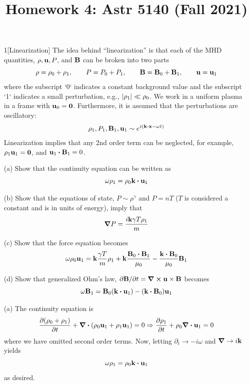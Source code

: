 \documentclass[12pt]{article}
\title{Homework 4: Astr 5140 (Fall 2021)}
\begin{document}
\maketitle
\begin{problem}{1}[Linearization]
The idea behind ``linearization'' is that each of the MHD quantities,
$\rho,\vb{u},P$, and $\vb{B}$ can be broken into two parts
\begin{equation}
    \rho=\rho_0+\rho_1,\qquad
    P=P_0+P_1,\qquad
    \vb{B}=\vb{B}_0+\vb{B}_1,\qquad
    \vb{u}=\vb{u}_1
\end{equation}
where the subscript `0` indicates a constant background value and the subscript
`1` indicates a small perturbation, e.g., $\abs{\rho_1}\ll\rho_0$. We work in a
uniform plasma in a frame with $\vb{u}_0=\vb{0}$. Furthermore, it is assumed
that the perturbations are oscillatory:
\begin{equation}
    \rho_1,P_1,\vb{B}_1,\vb{u}_1\sim e^{i(\vb{k}\vdot\vb{x}-\omega t)} 
\end{equation}
Linearization implies that any 2nd order term can be neglected, for example,
$\rho_1\vb{u}_1=\vb{0}$, and $\vb{u}_1\vdot\vb{B}_1=0$.

(a) Show that the continuity equation can be written as
\begin{equation}
    \omega\rho_1=\rho_0\vb{k}\vdot\vb{u}_1 
\end{equation}

(b) Show that the equations of state, $P\sim\rho^\gamma$ and $P=nT$ ($T$ is
considered a constant and is in units of energy), imply that
\begin{equation}
    \grad P=\frac{i\vb{k}\gamma T\rho_1}{m}
\end{equation}

(c) Show that the force equation becomes
\begin{equation}
    \omega\rho_0\vb{u}_1=\vb{k}\frac{\gamma
    T}{m}\rho_1+\vb{k}\frac{\vb{B}_0\vdot\vb{B}_1}{\mu_0}-\frac{\vb{k}\vdot\vb{B}_0}{\mu_0}\vb{B}_1 
\end{equation}

(d) Show that generalized Ohm's law, $\partial\vb{B} /\partial
t=\curl{\vb{u}\times\vb{B}}$ becomes
\begin{equation}
    \omega\vb{B}_1=\vb{B}_0(\vb{k}\vdot\vb{u}_1)-\qty(\vb{k}\vdot\vb{B}_0)\vb{u}_1 
\end{equation}
\begin{solution}
(a) The continuity equation is
\begin{equation}
    \frac{\partial(\rho_0+\rho_1)}{\partial
    t}+\div{\qty(\rho_0\vb{u}_1+\rho_1\vb{u}_1)}=0
    \Rightarrow
    \frac{\partial\rho_1}{\partial t}+\rho_0\div{\vb{u}_1}=0
\end{equation}
where we have omitted second order terms. Now, letting $\partial_t\to-i\omega$
and $\grad\to i\vb{k}$ yields
\begin{equation}
    \omega\rho_1=\rho_0\vb{k}\vdot\vb{u}_1 
\end{equation}
as desired.


\end{solution}
\end{problem}
\end{document}
